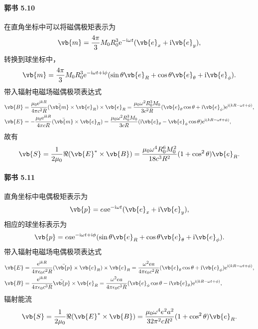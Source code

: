 \documentclass[12pt]{article}
\begin{document}
\paragraph{郭书 5.10}
在直角坐标中可以将磁偶极矩表示为
\begin{equation*}
  \vb{m} = \frac{4\pi}{3} M_0 R_0^3 \mathrm{e}^{-\mathrm{i} \omega t} (\vb{e}_x + \mathrm{i} \vb{e}_y),
\end{equation*}
转换到球坐标中，
\begin{equation*}
  \vb{m} = \frac{4\pi}{3} M_0 R_0^3 \mathrm{e}^{-\mathrm{i} \omega t + \mathrm{i} \phi} (\sin \theta \vb{e}_R + \cos \theta \vb{e}_{\theta} + \mathrm{i} \vb{e}_{\phi}). 
\end{equation*}
带入辐射电磁场磁偶极项表达式
\begin{align*}
  \vb{B} &= \frac{\mu_0 \mathrm{e}^{\mathrm{i} kR}}{4\pi c^2 R} (\ddot{\vb{m}} \times \vb{e}_R) \times \vb{e}_R = \frac{\mu_0 \omega^2 R_0^3 M_0}{3c^2 R} (\vb{e}_{\theta} \cos \theta + \mathrm{i} \vb{e}_{\phi}) \mathrm{e}^{\mathrm{i}(kR - \omega t + \phi)}, \\
  \vb{E} &= -\frac{\mu_0 \mathrm{e}^{\mathrm{i} kR}}{4\pi cR} (\ddot{\vb{m}} \times \vb{e}_R) = \frac{\mu_0 \omega^2 R_0^3 M_0}{3c R} (\mathrm{i} \vb{e}_{\theta} - \vb{e}_{\phi} \cos{\theta}) \mathrm{e}^{\mathrm{i}(kR - \omega t + \phi)},
\end{align*}
故有
\begin{equation*}
  \vb{S} = \frac{1}{2\mu_0} \Re(\vb{E}^{*} \times \vb{B}) = \frac{\mu_0 \omega^4 R_0^6 M_0^2}{18 c^3 R^2} (1 + \cos^2 \theta) \vb{e}_R.
\end{equation*}

\paragraph{郭书 5.11}
直角坐标中电偶极矩表示为
\begin{equation*}
  \vb{p} = ea \mathrm{e}^{-\mathrm{i} \omega t} (\vb{e}_x + \mathrm{i} \vb{e}_y),
\end{equation*}
相应的球坐标表示为
\begin{equation*}
  \vb{p} = ea \mathrm{e}^{-\mathrm{i} \omega t + \mathrm{i} \phi} (\sin \theta \vb{e}_R + \cos \theta \vb{e}_{\theta} + \mathrm{i} \vb{e}_{\phi}). 
\end{equation*}
带入辐射电磁场电偶极项表达式
\begin{align*}
  \vb{E} &= \frac{\mathrm{e}^{\mathrm{i} kR}}{4\pi \epsilon_0 c^2 R} (\ddot{\vb{p}} \times \vb{e}_R) \times \vb{e}_R = \frac{\omega^2 ea}{4\pi \epsilon_0 c^2 R} (\vb{e}_{\theta} \cos \theta + \mathrm{i} \vb{e}_{\phi}) \mathrm{e}^{\mathrm{i}(kR - \omega t + \phi)}, \\
  \vb{B} &= \frac{\mathrm{e}^{\mathrm{i} kR}}{4\pi \epsilon_0 c^3 R} \ddot{\vb{p}} \times \vb{e}_R = \frac{\omega^2 ea}{4\pi \epsilon_0 c^3 R} (\vb{e}_{\phi} \cos \theta - \mathrm{i} \vb{e}_{\theta}) \mathrm{e}^{\mathrm{i}(kR - \omega t + \phi)},
\end{align*}
辐射能流
\begin{equation*}
  \vb{S} = \frac{1}{2\mu_0} \Re(\vb{E}^{*} \times \vb{B}) = \frac{\mu_0 \omega^4 e^2 a^2}{32\pi^2 cR^2} (1 + \cos^2 \theta) \vb{e}_R.
\end{equation*}
\end{document}
